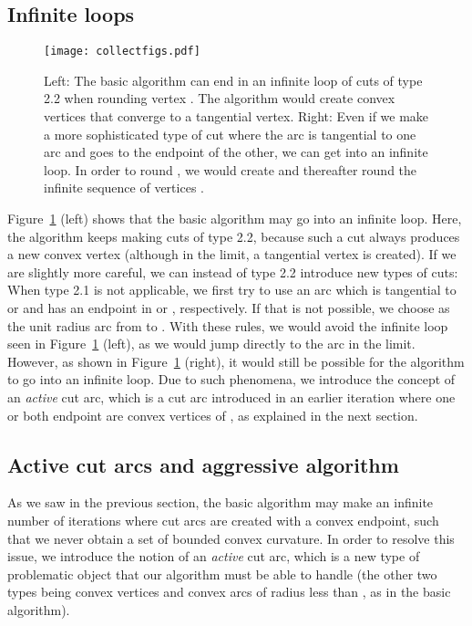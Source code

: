 \documentclass{article}
\begin{document}
\subsection{Infinite loops}\label{sec:infinite}

\begin{figure}
\centering
\texttt{[image: collectfigs.pdf]}
\caption{Left: The basic algorithm can end in an infinite loop of cuts of type 2.2 when rounding vertex .
The algorithm would create convex vertices  that converge to a tangential vertex.
Right: Even if we make a more sophisticated type of cut where the arc  is tangential to one arc and goes to the endpoint of the other, we can get into an infinite loop.
In order to round , we would create and thereafter round the infinite sequence of vertices .}
\label{fig:considerations1}
\end{figure}

Figure~\ref{fig:considerations1} (left) shows that the basic algorithm may go into an infinite loop.
Here, the algorithm keeps making cuts of type 2.2, because such a cut always produces a new convex vertex (although in the limit, a tangential vertex is created).
If we are slightly more careful, we can instead of type 2.2 introduce new types of cuts:
When type 2.1 is not applicable, we first try to use an arc which is tangential to  or  and has an endpoint in  or , respectively.
If that is not possible, we choose  as the unit radius arc from  to .
With these rules, we would avoid the infinite loop seen in Figure~\ref{fig:considerations1} (left), as we would jump directly to the arc in the limit.
However, as shown in Figure~\ref{fig:considerations1} (right), it would still be possible for the algorithm to go into an infinite loop.
Due to such phenomena, we introduce the concept of an \emph{active} cut arc, which is a cut arc introduced in an earlier iteration where one or both endpoint are convex vertices of , as explained in the next section.

\subsection{Active cut arcs and aggressive algorithm}\label{sec:active}

As we saw in the previous section, the basic algorithm may make an infinite number of iterations where cut arcs are created with a convex endpoint, such that we never obtain a set of bounded convex curvature.
In order to resolve this issue, we introduce the notion of an \emph{active} cut arc, which is a new type of problematic object that our algorithm must be able to handle (the other two types being convex vertices and convex arcs of radius less than , as in the basic algorithm).
\end{document}
